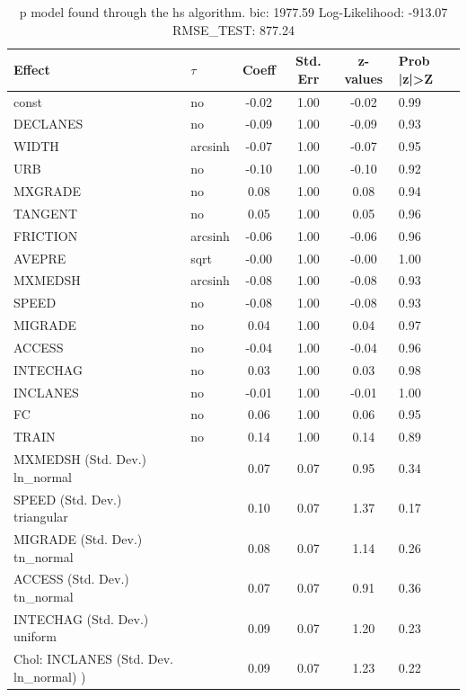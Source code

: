 \begin{table}
	\caption{p model found through the hs algorithm. bic: 1977.59 Log-Likelihood: -913.07 RMSE_TEST: 877.24}
	\begin{center}
		\begin{tabular}{|l|l|c|c|c|l|}
			\hline
			Effect & $\tau$ & Coeff & Std. Err & z-values & Prob |z|>Z \\
			\hline
			const & no & -0.02 & 1.00 & -0.02 & 0.99 \\
			\hline
			DECLANES & no & -0.09 & 1.00 & -0.09 & 0.93 \\
			\hline
			WIDTH & arcsinh & -0.07 & 1.00 & -0.07 & 0.95 \\
			\hline
			URB & no & -0.10 & 1.00 & -0.10 & 0.92 \\
			\hline
			MXGRADE & no & 0.08 & 1.00 & 0.08 & 0.94 \\
			\hline
			TANGENT & no & 0.05 & 1.00 & 0.05 & 0.96 \\
			\hline
			FRICTION & arcsinh & -0.06 & 1.00 & -0.06 & 0.96 \\
			\hline
			AVEPRE & sqrt & -0.00 & 1.00 & -0.00 & 1.00 \\
			\hline
			MXMEDSH & arcsinh & -0.08 & 1.00 & -0.08 & 0.93 \\
			\hline
			SPEED & no & -0.08 & 1.00 & -0.08 & 0.93 \\
			\hline
			MIGRADE & no & 0.04 & 1.00 & 0.04 & 0.97 \\
			\hline
			ACCESS & no & -0.04 & 1.00 & -0.04 & 0.96 \\
			\hline
			INTECHAG & no & 0.03 & 1.00 & 0.03 & 0.98 \\
			\hline
			INCLANES & no & -0.01 & 1.00 & -0.01 & 1.00 \\
			\hline
			FC & no & 0.06 & 1.00 & 0.06 & 0.95 \\
			\hline
			TRAIN & no & 0.14 & 1.00 & 0.14 & 0.89 \\
			\hline
			MXMEDSH (Std. Dev.) ln_normal &  & 0.07 & 0.07 & 0.95 & 0.34 \\
			\hline
			SPEED (Std. Dev.) triangular &  & 0.10 & 0.07 & 1.37 & 0.17 \\
			\hline
			MIGRADE (Std. Dev.) tn_normal &  & 0.08 & 0.07 & 1.14 & 0.26 \\
			\hline
			ACCESS (Std. Dev.) tn_normal &  & 0.07 & 0.07 & 0.91 & 0.36 \\
			\hline
			INTECHAG (Std. Dev.) uniform &  & 0.09 & 0.07 & 1.20 & 0.23 \\
			\hline
			 Chol: INCLANES (Std. Dev. ln_normal) ) &  & 0.09 & 0.07 & 1.23 & 0.22 \\

\end{tabular}
\end{center}
\end{table}
